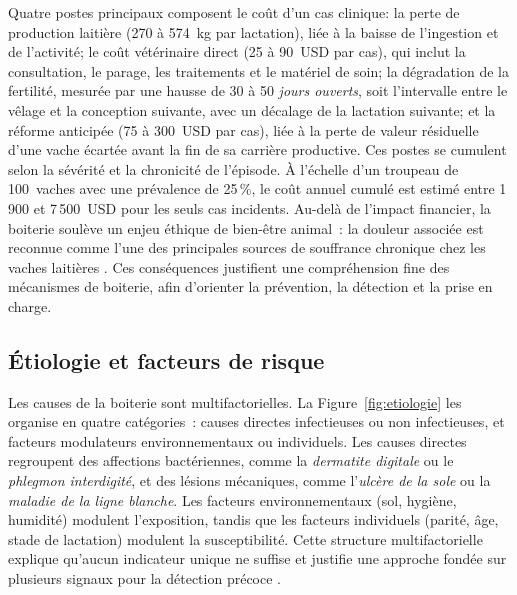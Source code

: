Quatre postes principaux composent le coût d'un cas clinique: la perte de production
laitière (270 à 574~kg par lactation), liée à la baisse de l'ingestion et de l'activité;
le coût vétérinaire direct (25 à 90~USD par cas), qui inclut la consultation, le parage,
les traitements et le matériel de soin; la dégradation de la fertilité, mesurée par une
hausse de 30 à 50 \textit{jours ouverts}, soit l'intervalle entre le vêlage et la
conception suivante, avec un décalage de la lactation suivante; et la réforme anticipée
(75 à 300~USD par cas), liée à la perte de valeur résiduelle d'une vache écartée avant la
fin de sa carrière productive. Ces postes se cumulent selon la sévérité et la chronicité
de l'épisode. À l'échelle d'un troupeau de 100~vaches avec une prévalence de 25\,\%, le
coût annuel cumulé est estimé entre 1\,900 et 7\,500~USD pour les seuls cas incidents.
Au-delà de l'impact financier, la boiterie soulève un enjeu éthique de bien-être animal~:
la douleur associée est reconnue comme l'une des principales sources de souffrance
chronique chez les vaches laitières \citep{whay2003assessment,broom2017animal}. Ces conséquences
justifient une compréhension fine des mécanismes de boiterie, afin d'orienter la
prévention, la détection et la prise en charge.

\subsection{Étiologie et facteurs de risque}
Les causes de la boiterie sont multifactorielles. La Figure~\ref{fig:etiologie} les
organise en quatre catégories~: causes directes infectieuses ou non infectieuses, et
facteurs modulateurs environnementaux ou individuels. Les causes directes regroupent des
affections bactériennes, comme la \textit{dermatite digitale} ou le \textit{phlegmon
interdigité}, et des lésions mécaniques, comme l'\textit{ulcère de la sole} ou la
\textit{maladie de la ligne blanche}. Les facteurs environnementaux (sol, hygiène,
humidité) modulent l'exposition, tandis que les facteurs individuels (parité, âge, stade
de lactation) modulent la susceptibilité. Cette structure multifactorielle explique
qu'aucun indicateur unique ne suffise et justifie une approche fondée sur plusieurs signaux
pour la détection précoce
\citep{merck_hoof_origin_lameness_cattle,dairynz_preventing_managing_lameness_guide_2025}.

